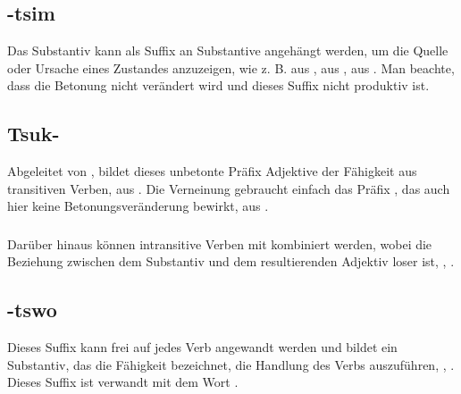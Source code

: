 \subsection{-tsim} Das Substantiv   kann als Suffix an Substantive angehängt werden, um die Quelle oder Ursache eines Zustandes anzuzeigen, wie z. B.   aus  ,   aus  ,   aus  . Man beachte, dass die Betonung nicht verändert wird und dieses Suffix nicht produktiv ist.

\subsection{Tsuk-} Abgeleitet von , bildet dieses unbetonte Präfix Adjektive der Fähigkeit aus transitiven Verben,   aus  . Die Verneinung gebraucht einfach das Präfix , das auch hier keine Betonungsveränderung bewirkt,   aus  .

\subsubsection{} Darüber hinaus können intransitive Verben mit  kombiniert werden, wobei die Beziehung zwischen dem Substantiv und dem resultierenden Adjektiv loser ist,  ,  .

\subsection{-tswo} Dieses Suffix kann frei auf jedes Verb angewandt werden und bildet ein Substantiv, das die Fähigkeit bezeichnet, die Handlung des Verbs auszuführen,  ,  . Dieses Suffix ist verwandt mit dem Wort  .

